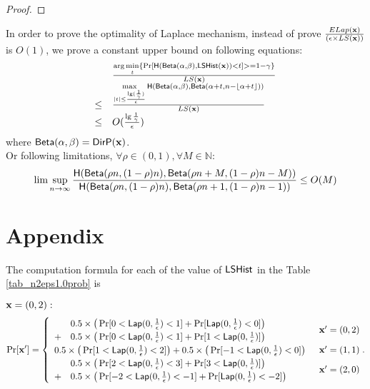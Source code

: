 \documentclass{article}
\begin{document}
{\begin{proof}
\end{proof}
\begin{thm}
In order to prove the optimality of Laplace mechanism, instead of prove
$\frac{ELap(\textbf{x})}{(\epsilon \times LS(\textbf{x}))}$ is $O(1)$, we prove a constant upper bound on following equations:
\[
\begin{array}{ll}
	 &	\frac{\arg\min\limits_{t}\{\Pr[\mathsf{H}(\mathsf{Beta}(\alpha, \beta), \mathsf{LSHist}(\textbf{x}))< t] >= 1 - \gamma\}}
	 	{	LS(\textbf{x})	}\\
\leq &	\frac{\max\limits_{|t| \leq \frac{\lg(\frac{1}{\gamma})}{\epsilon}}
		\mathsf{H}(\mathsf{Beta}(\alpha, \beta), \mathsf{Beta}(\alpha + t, n - \lfloor \alpha + t \rfloor))}
		{	LS(\textbf{x})	}\\
\leq & 	O(\frac{\lg{\frac{1}{\gamma}}}{\epsilon})
\end{array}
\]
where $\mathsf{Beta}(\alpha, \beta) = \mathsf{DirP}(\textbf{x}) $.\\
Or following limitations, $\forall \rho \in (0,1), \forall M \in \mathbb{N}$:
\[
\lim\sup\limits_{n \rightarrow \infty} \frac{\mathsf{H}(\mathsf{Beta}(\rho n, (1 - \rho) n), \mathsf{Beta}(\rho n + M, (1 - \rho) n - M))}{\mathsf{H}(\mathsf{Beta}(\rho n, (1 - \rho) n), \mathsf{Beta}(\rho n + 1, (1 - \rho) n - 1))}
\leq O(M)
\]
\end{thm}

\newpage

\section*{Appendix}
The computation formula for each of the value of $\mathsf{LSHist}$ in the Table \ref{tab_n2eps1.0prob} is

{\scriptsize
\noindent $\textbf{x} = (0,2):$
\[
\Pr[\textbf{x}']
= \begin{cases}
\begin{array}{ll}
 	& 0.5 \times 
 	\big(
 	\Pr[	0	< \mathsf{Lap}(0, \frac{1}{\epsilon})	<	1] 
 	+ 
 	\Pr[	\mathsf{Lap}(0, \frac{1}{\epsilon})			<	0] 
 	\big) \\
 	+ 	
 	& 0.5 \times 
 	\big(
 	\Pr[	0	< \mathsf{Lap}(0, \frac{1}{\epsilon})	<	1] 
 	+ 
 	\Pr[	1 	< \mathsf{Lap}(0, \frac{1}{\epsilon})] 
 	\big) 
\end{array} 
	& \textbf{x}' = (0, 2)\\
\begin{array}{ll}
 	0.5 \times 
 	\big(
 	\Pr[	1	< \mathsf{Lap}(0, \frac{1}{\epsilon})	<	2] 
 	\big)
 	+ 	
 	0.5 \times 
 	\big(
 	\Pr[	-1	< \mathsf{Lap}(0, \frac{1}{\epsilon})	<	0] 
 	\big) 
\end{array}  
	& \textbf{x}' = (1, 1)\\
\begin{array}{ll}
 	& 0.5 \times 
 	\big(
 	\Pr[	2	<	\mathsf{Lap}(0, \frac{1}{\epsilon})	<	3] 
 	+ 
 	\Pr[	3	<	\mathsf{Lap}(0, \frac{1}{\epsilon})]
 	\big) \\
 	+ 	
 	& 0.5 \times 
 	\big(
 	\Pr[	-2	< \mathsf{Lap}(0, \frac{1}{\epsilon})	<	-1] 
 	+ 
 	\Pr[	\mathsf{Lap}(0, \frac{1}{\epsilon})			<	-2] 
 	\big) 
\end{array}  
& \textbf{x}' = (2, 0)
\end{cases}.
\]


}}
\end{document}
